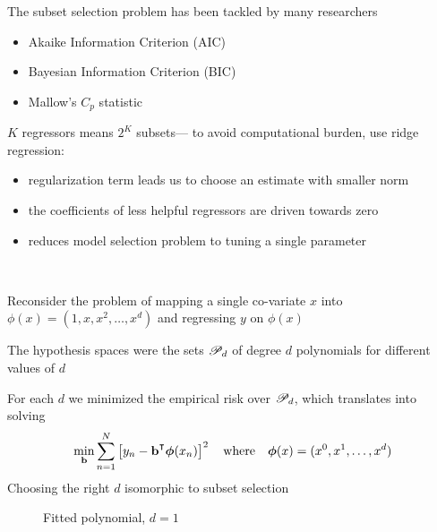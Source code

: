\begin{frame}

    \vspace{2em}
    The subset selection problem has been tackled by many researchers
        \begin{itemize}
            \item Akaike Information Criterion (AIC)
            \item  Bayesian Information Criterion (BIC)
            \item  Mallow's $C_p$ statistic
        \end{itemize}
    
    \vspace{.7em}
    $K$ regressors means $2^K$
    subsets--- to avoid computational burden, use ridge regression:
    \begin{itemize}
        \item regularization term leads us to choose an estimate with smaller norm
        \item the coefficients of less helpful regressors are
    driven towards zero
        \item reduces model selection problem to tuning a single
    parameter
    \end{itemize}
    \
\end{frame}

\begin{frame}

    \vspace{2em}
    Reconsider the problem of mapping a single co-variate $x$ 
    into $\phi(x) = (1,x, x^{2},\dots, x^{d})$ and regressing 
    $y$ on $\phi(x)$
    
    The hypothesis
    spaces were the sets $\mathscr P_d$ of degree $d$ polynomials for different values of
    $d$
    
    \vspace{.7em}
    For each $d$ we minimized the empirical risk over $\mathscr P_d$, which
    translates into solving 
    \begin{equation*}
        \min_{\boldb} \sum_{n=1}^N 
            \left[ y_n - \boldb^\T\boldphi(x_n) \right]^2
            \quad \text{where} \quad
            \boldphi(x) = (x^0, x^1,\ldots, x^d)
    \end{equation*}
    Choosing the right $d$ isomorphic to subset selection
    
\end{frame}

\begin{frame}

    \begin{figure}
       \begin{center}
        \scalebox{.44}{\texttt{[image: ofit1.pdf]}}
        \caption{\label{f:ofit1} Fitted polynomial, $d=1$}
       \end{center}
    \end{figure}
    
\end{frame}

